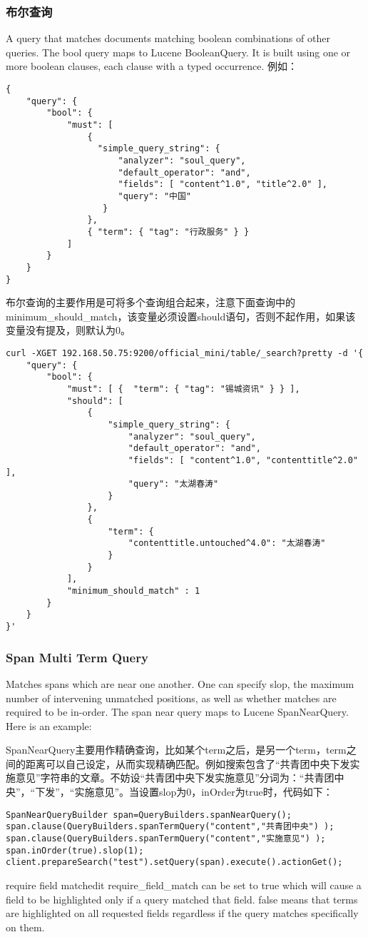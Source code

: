\subsubsection{布尔查询}
A query that matches documents matching boolean combinations of other queries. The bool query maps to Lucene BooleanQuery. It is built using one or more boolean clauses, each clause with a typed occurrence. 例如：
\begin{verbatim}
{
    "query": {
        "bool": {
            "must": [
                {
                  "simple_query_string": {
                      "analyzer": "soul_query", 
                      "default_operator": "and", 
                      "fields": [ "content^1.0", "title^2.0" ], 
                      "query": "中国"
                   }
                }, 
                { "term": { "tag": "行政服务" } }
            ]
        }
    } 
}
\end{verbatim}
\par 布尔查询的主要作用是可将多个查询组合起来，注意下面查询中的minimum\_should\_match，该变量必须设置should语句，否则不起作用，如果该变量没有提及，则默认为0。
\begin{verbatim}
curl -XGET 192.168.50.75:9200/official_mini/table/_search?pretty -d '{
    "query": {
        "bool": {
            "must": [ {  "term": { "tag": "锡城资讯" } } ], 
            "should": [
                {
                    "simple_query_string": {
                        "analyzer": "soul_query", 
                        "default_operator": "and", 
                        "fields": [ "content^1.0", "contenttitle^2.0" ], 
                        "query": "太湖春涛"
                    }
                }, 
                {
                    "term": {
                        "contenttitle.untouched^4.0": "太湖春涛"
                    }
                }
            ], 
            "minimum_should_match" : 1
        }
    } 
}'
\end{verbatim}
\subsubsection{Span Multi Term Query}
\par Matches spans which are near one another. One can specify slop, the maximum number of intervening unmatched positions, as well as whether matches are required to be in-order. The span near query maps to Lucene SpanNearQuery. Here is an example:
\par SpanNearQuery主要用作精确查询，比如某个term之后，是另一个term，term之间的距离可以自己设定，从而实现精确匹配。例如搜索包含了“共青团中央下发实施意见”字符串的文章。不妨设“共青团中央下发实施意见”分词为：“共青团中央”，“下发”，“实施意见”。当设置slop为0，inOrder为true时，代码如下：
\begin{verbatim}
SpanNearQueryBuilder span=QueryBuilders.spanNearQuery();
span.clause(QueryBuilders.spanTermQuery("content","共青团中央") );
span.clause(QueryBuilders.spanTermQuery("content","实施意见") );
span.inOrder(true).slop(1);
client.prepareSearch("test").setQuery(span).execute().actionGet();
\end{verbatim}

require field matchedit
require\_field\_match can be set to true which will cause a field to be highlighted only if a query matched that field. false means that terms are highlighted on all requested fields regardless if the query matches specifically on them.